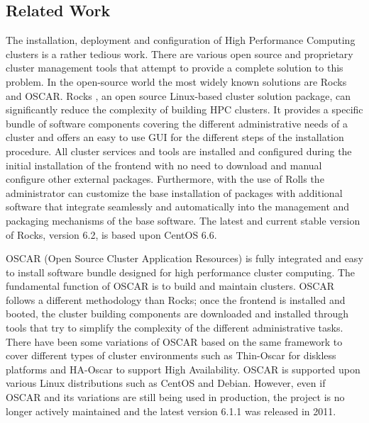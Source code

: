 \subsection{Related Work} \label{sec:related_work}

The installation, deployment and configuration of High Performance Computing
clusters is a rather tedious work.  There are various open source and
proprietary cluster management tools that attempt to provide a complete
solution to this problem.  In the open-source world the most widely known
solutions are Rocks and OSCAR.  Rocks \cite{rocks2003,rocks_url}, an open
source Linux-based cluster solution package, can significantly reduce the
complexity of building HPC clusters.  It provides a specific bundle of software
components covering the different administrative needs of a cluster and offers
an easy to use GUI for the different steps of the installation procedure.  All
cluster services and tools are installed and configured during the initial
installation of the frontend with no need to download and manual configure
other external packages. Furthermore, with the use of Rolls \cite{rolls2004}
the administrator can customize the base installation of packages with
additional software that integrate seamlessly and automatically into the
management and packaging mechanisms of the base software.
The latest and current stable version of Rocks, version 6.2, is based upon
CentOS 6.6.

OSCAR \cite{oscar2001,oscar_url} (Open Source Cluster Application Resources) is
fully integrated and easy to install software bundle designed for high
performance cluster computing. The fundamental function of OSCAR is to build
and maintain clusters.  OSCAR follows a different methodology than Rocks; once
the frontend is installed and booted, the cluster building components are
downloaded and installed through tools that try to simplify the complexity of
the different administrative tasks.  There have been some variations of OSCAR
based on the same framework to cover different types of cluster environments
such as Thin-Oscar for diskless platforms and HA-Oscar to support High
Availability. OSCAR is supported upon various Linux distributions such as
CentOS and Debian. However, even if OSCAR and its variations are still being
used in production, the project is no longer actively maintained and the latest
version 6.1.1 was released in 2011.

